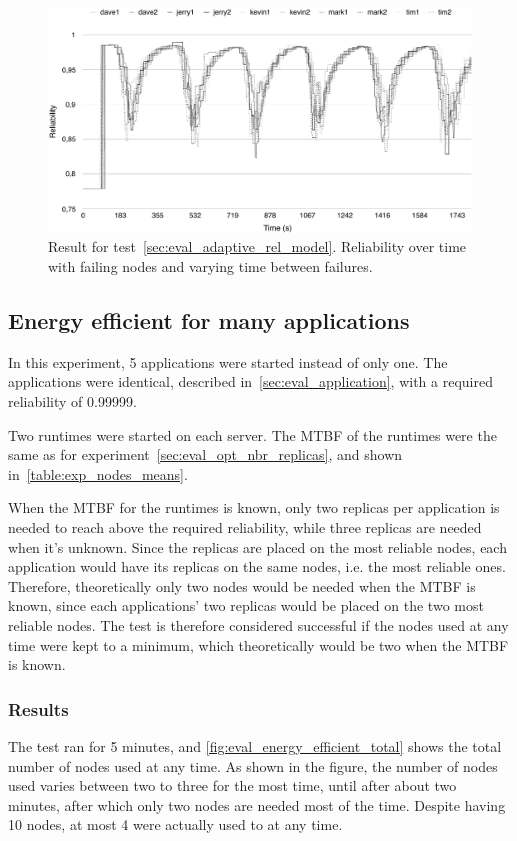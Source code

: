 \documentclass{cslthse-msc}
\begin{document}
\begin{figure}[!hbt]
\centering
\includegraphics[scale=0.5]{images/results/self_adaptive_node_rels.pdf}
\caption{Result for test~\ref{sec:eval_adaptive_rel_model}. Reliability over time with failing nodes and varying time between failures.} \label{fig:eval_self_adaptive_node_rels}
\end{figure}

\subsection{Energy efficient for many applications} \label{sec:eval_energy_efficient}
In this experiment, 5 applications were started instead of only one. The applications were identical, described in~\cref{sec:eval_application}, with a required reliability of 0.99999. 

Two runtimes were started on each server. The MTBF of the runtimes were the same as for experiment~\cref{sec:eval_opt_nbr_replicas}, and shown in~\cref{table:exp_nodes_means}.

When the MTBF for the runtimes is known, only two replicas per application is needed to reach above the required reliability, while three replicas are needed when it's unknown. Since the replicas are placed on the most reliable nodes, each application would have its replicas on the same nodes, i.e. the most reliable ones. Therefore, theoretically only two nodes would be needed when the MTBF is known, since each applications' two replicas would be placed on the two most reliable nodes. The test is therefore considered successful if the nodes used at any time were kept to a minimum, which theoretically would be two when the MTBF is known.

\subsubsection*{Results}
The test ran for 5 minutes, and \cref{fig:eval_energy_efficient_total} shows the total number of nodes used at any time. As shown in the figure, the number of nodes used varies between two to three for the most time, until after about two minutes, after which only two nodes are needed most of the time. Despite having 10 nodes, at most 4 were actually used to at any time.
\end{document}
